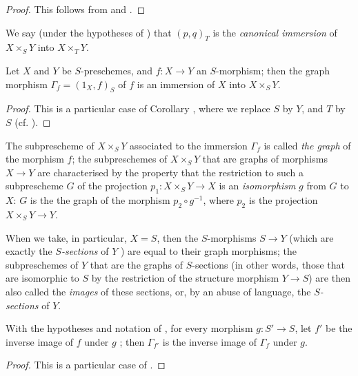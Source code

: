 \begin{proof}
\label{proof-1.5.3.10}
This follows from  and .
\end{proof}

We say (under the hypotheses of ) that $(p,q)_T$ is the \emph{canonical immersion} of $X\times_S Y$ into $X\times_T Y$.

\begin{corollary}[5.3.11]
\label{1.5.3.11}
Let $X$ and $Y$ be $S$-preschemes, and $f:X\to Y$ an $S$-morphism;
then the graph morphism $\Gamma_f=(1_X,f)_S$ of $f$  is an immersion of $X$ into $X\times_S Y$.
\end{corollary}

\begin{proof}
\label{proof-1.5.3.11}
This is a particular case of Corollary , where we replace $S$ by $Y$, and $T$ by $S$ (cf. ).
\end{proof}

The subprescheme of $X\times_S Y$ associated to the immersion $\Gamma_f$  is called \emph{the graph} of the morphism $f$;
the subpreschemes of $X\times_S Y$ that are graphs of morphisms $X\to Y$ are characterised by the property that the restriction to such a subprescheme $G$ of the projection $p_1:X\times_S Y\to X$ is an \emph{isomorphism} $g$ from $G$ to $X$:
$G$ is the the graph of the morphism $p_2\circ g^{-1}$, where $p_2$ is the projection $X\times_S Y\to Y$.

When we take, in particular, $X=S$, then the $S$-morphisms $S\to Y$ (which are exactly the \emph{$S$-sections} of $Y$ ) are equal to their graph morphisms;
the subpreschemes of $Y$ that are the graphs of $S$-sections (in other words, those that are isomorphic to $S$ by the restriction of the structure morphism $Y\to S$) are then also called the \emph{images} of these sections, or, by an abuse of language, the \emph{$S$-sections} of $Y$.

\begin{corollary}[5.3.12]
\label{1.5.3.12}
With the hypotheses and notation of , for every morphism $g:S'\to S$, let $f'$ be the inverse image of $f$ under $g$ ;
then $\Gamma_{f'}$ is the inverse image of $\Gamma_f$ under $g$.
\end{corollary}

\begin{proof}
\label{proof-1.5.3.12}
This is a particular case of .
\end{proof}

